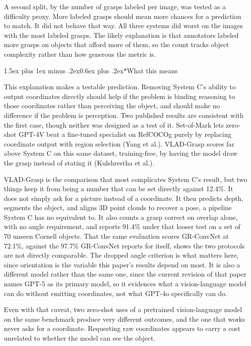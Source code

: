 \documentclass[12pt,letterpaper]{article}
\makeatletter
\renewcommand{\subsection}{\@startsection{subsection}{2}{0pt}%
  {1.5ex plus 1ex minus .2ex}{0.6ex plus .2ex}{\normalsize\itshape}}
\makeatother
\begin{document}
A second split, by the number of grasps labeled per image, was tested
as a difficulty proxy. More labeled grasps should mean more chances for
a prediction to match. It did not behave that way. All three systems
did worst on the images with the most labeled grasps. The likely
explanation is that annotators labeled more grasps on objects that
afford more of them, so the count tracks object complexity rather than
how generous the metric is.

\subsection*{What this means}

This explanation makes a testable prediction. Removing System C's
ability to output coordinates directly should help if the problem is
binding reasoning to those coordinates rather than perceiving the
object, and should make no difference if the problem is perception. Two
published results are consistent with the first case, though neither
was designed as a test of it. Set-of-Mark lets zero-shot GPT-4V beat a
fine-tuned specialist on RefCOCOg purely by replacing coordinate output
with region selection (Yang et al.). VLAD-Grasp scores far above System
C on this same dataset, training-free, by having the model draw the
grasp instead of stating it (Kulshrestha et al.).

VLAD-Grasp is the comparison that most complicates System C's result,
but two things keep it from being a number that can be set directly
against 12.4\%. It does not simply ask for a picture instead of a
coordinate. It then predicts depth, segments the object, and aligns 3D
point clouds to recover a pose, a pipeline System C has no equivalent
to. It also counts a grasp correct on overlap alone, with no angle
requirement, and reports 91.4\% under that looser test on a set of 70
unseen Cornell objects. That the same evaluation scores GR-ConvNet at
72.1\%, against the 97.7\% GR-ConvNet reports for itself, shows the two
protocols are not directly comparable. The dropped angle criterion is
what matters here, since orientation is the variable this paper's
results depend on most. It is also a different model rather than the
same one, since the current revision of that paper names GPT-5 as its
primary model, so it evidences what a vision-language model can do
without emitting coordinates, not what GPT-4o specifically can do.

Even with that caveat, two zero-shot uses of a pretrained
vision-language model on the same benchmark produce very different
outcomes, and the one that works never asks for a coordinate.
Requesting raw coordinates appears to carry a cost unrelated to whether
the model can see the object.
\end{document}
